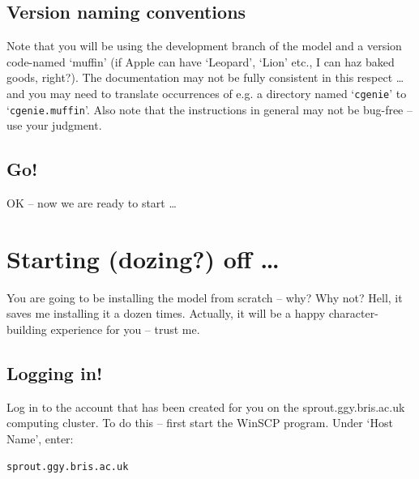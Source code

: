 \documentclass[11pt,fleqn]{book} %
\begin{document}

\subsection{Version naming conventions}

Note that you will be using the development branch of the model and a version code-named ‘muffin’ (if Apple can have ‘Leopard’, ‘Lion’ etc., I can haz baked goods, right?). The documentation may not be fully consistent in this respect … and you may need to translate occurrences of e.g. a directory named ‘\texttt{cgenie}’ to ‘\texttt{cgenie.muffin}’.  Also note that the instructions in general may not be bug-free – use your judgment.


\subsection{Go!}

OK – now we are ready to start …


\newpage


\section{Starting (dozing?) off …}

You are going to be installing the model from scratch – why? Why not? Hell, it saves me installing it a dozen times. Actually, it will be a happy character-building experience for you – trust me.


\subsection{Logging in!}

Log in to the account that has been created for you on the sprout.ggy.bris.ac.uk computing cluster. To do this – first start the WinSCP program. Under ‘Host Name’, enter:

\begin{verbatim}
sprout.ggy.bris.ac.uk
\end{verbatim}
\end{document}
